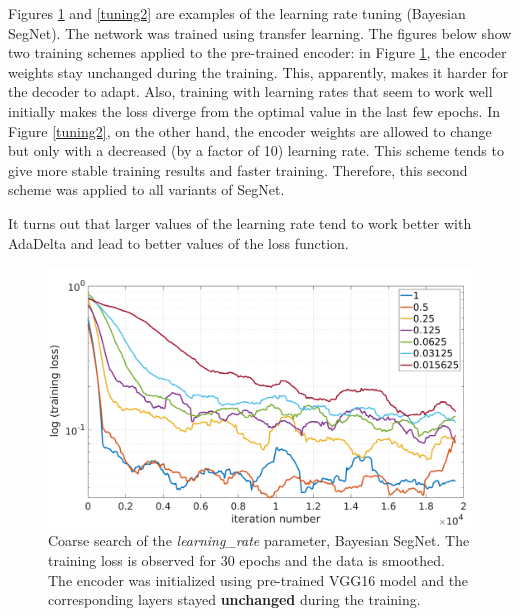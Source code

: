 Figures \ref{tuning1} and \ref{tuning2} are examples of the learning rate tuning (Bayesian SegNet). The network was trained using transfer learning. The figures below show two training schemes applied to the pre-trained encoder: in Figure \ref{tuning1}, the encoder weights stay unchanged during the training. This, apparently, makes it harder for the decoder to adapt. Also, training with learning rates that seem to work well initially makes the loss diverge from the optimal value in the last few epochs. In Figure \ref{tuning2}, on the other hand, the encoder weights are allowed to change but only with a decreased (by a factor of 10) learning rate. This scheme tends to give more stable training results and faster training. Therefore, this second scheme was applied to all variants of SegNet.  

It turns out that larger values of the learning rate tend to work better with AdaDelta and lead to better values of the loss function. 

\newpage

\begin{figure}[h]
	\begin{center}
		\includegraphics*[width=14cm, keepaspectratio]{obr/bayes_full_rough.png}
	\end{center}
	\vspace{5mm}
	\caption{Coarse search of the \textit{learning\_rate} parameter, Bayesian SegNet. The training loss is observed for 30 epochs and the data is smoothed. The encoder was initialized using pre-trained VGG16 model and the corresponding layers stayed \textbf{unchanged} during the training.} 
	\label{tuning1}
\end{figure}

